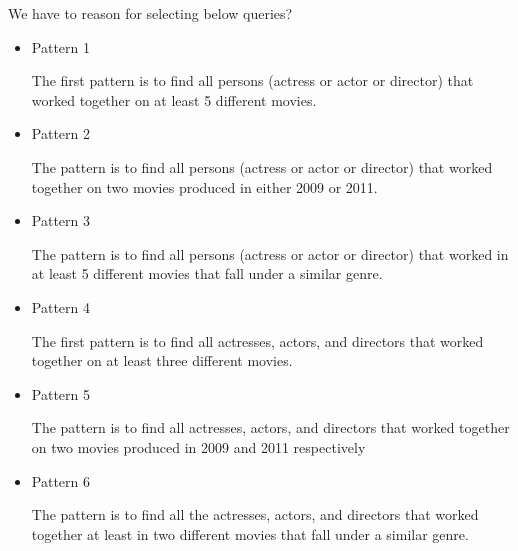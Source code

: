 We have to reason for selecting below queries?

\begin{itemize}

\item Pattern 1

The first pattern is to find all persons (actress or actor or director) that worked together on at least 5 different movies.

\item Pattern 2

The pattern is to find all persons (actress or actor or director) that worked together on two movies produced in either 2009 or 2011.

\item Pattern 3

The pattern is to find all persons (actress or actor or director) that worked in at least 5 different movies that fall under a similar genre.

\item Pattern 4

The first pattern is to find all actresses, actors, and directors that worked together on at least three different movies.

\item Pattern 5

The pattern is to find all actresses, actors, and directors that worked together on two movies produced in 2009 and 2011 respectively

\item Pattern 6

The pattern is to find all the actresses, actors, and directors that worked together at least in two different movies that fall under a similar genre.

\end{itemize}
